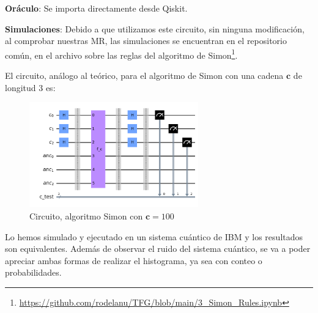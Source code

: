  \vspace{8pt}

 \textbf{Oráculo}: Se importa directamente desde Qiskit.\newline

 \textbf{Simulaciones}: Debido a que utilizamos este circuito, sin ninguna modificación, al comprobar nuestras MR, las simulaciones se encuentran en el repositorio común, en el archivo sobre las reglas del algoritmo de Simon\footnote{\url{https://github.com/rodelanu/TFG/blob/main/3_Simon_Rules.ipynb}}.

 \vspace{8pt}

 El circuito, análogo al teórico, para el algoritmo de Simon con una cadena $\mathbf{c}$ de longitud 3 es:

 
 \begin{figure}[H]
    \centering
    \includegraphics[width=0.65\textwidth]{TFG/imagenes/simon1.png}
    \caption{Circuito, algoritmo Simon con $\mathbf{c}=100$}
    \label{Fig:CircuitoSimon1}
 \end{figure}

 Lo hemos simulado y ejecutado en un sistema cuántico de IBM y los resultados son equivalentes. Además de observar el ruido del sistema cuántico, se va a poder apreciar ambas formas de realizar el histograma, ya sea con conteo o probabilidades.

